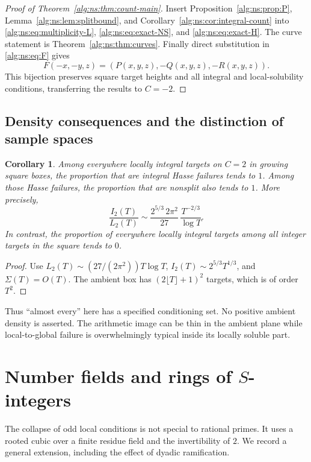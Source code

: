 \documentclass[11pt]{article}
\numberwithin{equation}{section}
\theoremstyle{plain}
\theoremstyle{plain}
\theoremstyle{plain}
\newtheorem{corollary}[corollary]{Corollary}
\theoremstyle{definition}
\theoremstyle{definition}
\theoremstyle{definition}
\theoremstyle{remark}
\begin{document}
\begin{proof}[Proof of Theorem~\ref{alg:ns:thm:count-main}]
Insert Proposition~\ref{alg:ns:prop:P}, Lemma~\ref{alg:ns:lem:splitbound}, and
Corollary~\ref{alg:ns:cor:integral-count} into
\eqref{alg:ns:eq:multiplicity-L}, \eqref{alg:ns:eq:exact-NS}, and \eqref{alg:ns:eq:exact-H}.
The curve statement is Theorem~\ref{alg:ns:thm:curves}. Finally direct
substitution in \eqref{alg:ns:eq:F} gives
\[
F(-x,-y,z)=(P(x,y,z),-Q(x,y,z),-R(x,y,z)).
\]
This bijection preserves square target heights and all integral and
local-solubility conditions, transferring the results to $C=-2$.
\end{proof}

\subsection{Density consequences and the distinction of sample spaces}
\begin{corollary}\label{alg:ns:cor:density}
Among everywhere locally integral targets on $C=2$ in growing square
boxes, the proportion that are integral Hasse failures tends to $1$.
Among those Hasse failures, the proportion that are nonsplit also tends
to $1$. More precisely,
\[
\frac{I_2(T)}{L_2(T)}
\sim\frac{2^{5/3}\,2\pi^2}{27}\,
\frac{T^{-2/3}}{\log T}.
\]
In contrast, the proportion of everywhere locally integral targets
among \emph{all} integer targets in the square tends to $0$.
\end{corollary}
\begin{proof}
Use $L_2(T)\sim(27/(2\pi^2))T\log T$,
$I_2(T)\sim2^{5/3}T^{1/3}$, and $\Sigma(T)=O(T)$. The ambient box has
$(2\lfloor T\rfloor+1)^2$ targets, which is of order $T^2$.
\end{proof}
Thus ``almost every'' here has a specified conditioning set. No positive
ambient density is asserted. The arithmetic image can be thin in the
ambient plane while local-to-global failure is overwhelmingly typical
inside its locally soluble part.

\section{Number fields and rings of \texorpdfstring{$S$}{S}-integers}\label{alg:ns:sec:numberfields}

The collapse of odd local conditions is not special to rational primes.
It uses a rooted cubic over a finite residue field and the invertibility
of $2$. We record a general extension, including the effect of dyadic
ramification.
\end{document}
